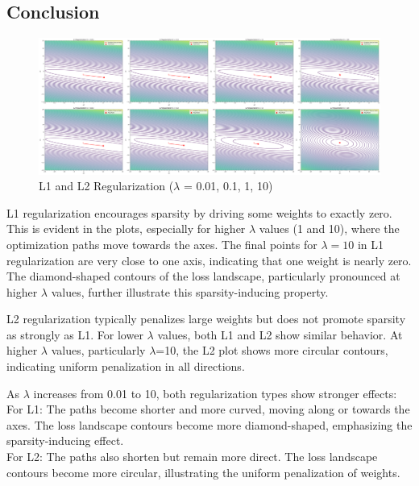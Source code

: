 \documentclass{article}
\begin{document}
\subsection{Conclusion}
\begin{figure}[h]
    \centering
    \begin{minipage}{1\textwidth}
        \centering
        \includegraphics[width=\textwidth]{figures/T4.png} 
        \caption{L1 and L2 Regularization ($\lambda$ = 0.01, 0.1, 1, 10)}
    \end{minipage}
\end{figure}

L1 regularization encourages sparsity by driving some weights to exactly zero. This is evident in the plots, especially for higher $\lambda$ values (1 and 10), where the optimization paths move towards the axes. The final points for $\lambda = 10$ in L1 regularization are very close to one axis, indicating that one weight is nearly zero. The diamond-shaped contours of the loss landscape, particularly pronounced at higher $\lambda$ values, further illustrate this sparsity-inducing property.

L2 regularization typically penalizes large weights but does not promote sparsity as strongly as L1. For lower $\lambda$ values, both L1 and L2 show similar behavior. At higher $\lambda$ values, particularly $\lambda$=10, the L2 plot shows more circular contours, indicating uniform penalization in all directions.

As $\lambda$ increases from 0.01 to 10, both regularization types show stronger effects:\\
For L1: The paths become shorter and more curved, moving along or towards the axes. The loss landscape contours become more diamond-shaped, emphasizing the sparsity-inducing effect.\\
For L2: The paths also shorten but remain more direct. The loss landscape contours become more circular, illustrating the uniform penalization of weights.
\end{document}
